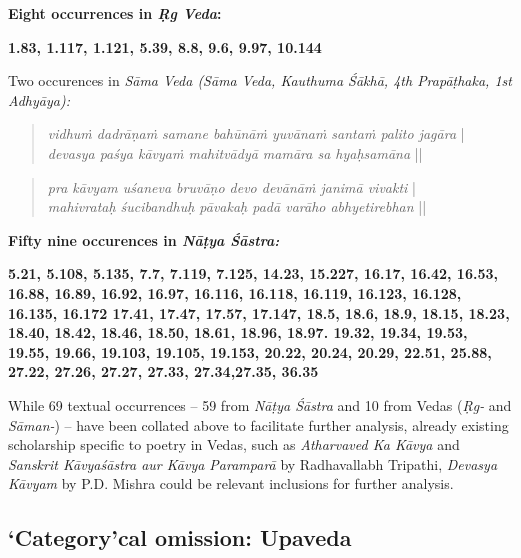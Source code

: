 \textbf{Eight occurrences in \textit{Ṛg Veda}:}

\textbf{1.83, 1.117, 1.121, 5.39, 8.8, 9.6, 9.97, 10.144}

Two occurences in \textit{Sāma Veda (Sāma Veda, Kauthuma Śākhā, 4th Prapāṭhaka, 1st Adhyāya):}

\vskip 4pt

\begin{verse}
\textit{vidhuṁ dadrāṇaṁ samane bahūnāṁ yuvānaṁ santaṁ palito jagāra} |\\\textit{devasya paśya kāvyaṁ mahitvādyā mamāra sa hyaḥ\break samāna} || 
\end{verse}

\vskip 4pt

\begin{verse}
\textit{pra kāvyam uśaneva bruvāṇo devo devānāṁ janimā vivakti} |\\\textit{mahivrataḥ śucibandhuḥ pāvakaḥ padā varāho abhyeti\break rebhan} || 
\end{verse}

\vskip 4pt

\newpage

\textbf{Fifty nine occurences in \textit{Nāṭya Śāstra:}}

\textbf{5.21, 5.108, 5.135, 7.7, 7.119, 7.125, 14.23, 15.227, 16.17, 16.42, 16.53, 16.88, 16.89, 16.92, 16.97, 16.116, 16.118, 16.119, 16.123, 16.128, 16.135, 16.172 17.41, 17.47, 17.57, 17.147, 18.5, 18.6, 18.9, 18.15, 18.23, 18.40, 18.42, 18.46, 18.50, 18.61, 18.96, 18.97. 19.32, 19.34, 19.53, 19.55, 19.66, 19.103, 19.105, 19.153, 20.22, 20.24, 20.29, 22.51, 25.88, 27.22, 27.26, 27.27, 27.33, 27.34,27.35, 36.35}

While 69 textual occurrences – 59 from \textit{Nāṭya Śāstra} and 10 from Vedas (\textit{Ṛg-} and \textit{Sāman-}) – have been collated above to facilitate further analysis, already existing scholarship specific to poetry in Vedas, such as \textit{Atharvaved Ka Kāvya} and \textit{Sanskrit Kāvyaśāstra aur Kāvya Paramparā} by Radhavallabh Tripathi, \textit{Devasya Kāvyam} by P.D. Mishra could be relevant inclusions for further analysis.


\subsection{‘Category'cal omission: Upaveda}

